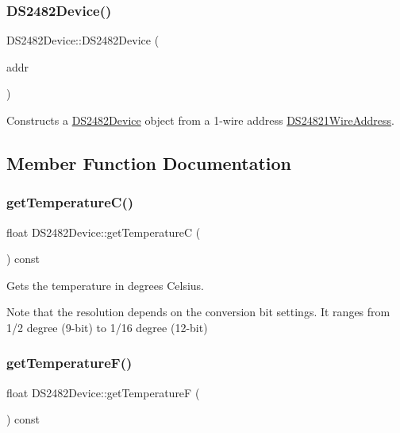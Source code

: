 \subsubsection{\texorpdfstring{D\+S2482\+Device()}{DS2482Device()}}
{\footnotesize\ttfamily D\+S2482\+Device\+::\+D\+S2482\+Device (\begin{DoxyParamCaption}\item[{const \mbox{\hyperlink{class_d_s24821_wire_address}{D\+S24821\+Wire\+Address}} \&}]{addr }\end{DoxyParamCaption})}

Constructs a \mbox{\hyperlink{class_d_s2482_device}{D\+S2482\+Device}} object from a 1-\/wire address \mbox{\hyperlink{class_d_s24821_wire_address}{D\+S24821\+Wire\+Address}}. 

\subsection{Member Function Documentation}
\mbox{\label{class_d_s2482_device_a62d317b9ec8b672fbeb8c16fa480ddd7}} 
\subsubsection{\texorpdfstring{get\+Temperature\+C()}{getTemperatureC()}}
{\footnotesize\ttfamily float D\+S2482\+Device\+::get\+TemperatureC (\begin{DoxyParamCaption}{ }\end{DoxyParamCaption}) const\hspace{0.3cm}{\ttfamily [inline]}}



Gets the temperature in degrees Celsius. 

Note that the resolution depends on the conversion bit settings. It ranges from 1/2 degree (9-\/bit) to 1/16 degree (12-\/bit) \mbox{\label{class_d_s2482_device_a61ede76341c0c6409ae3faecadbd1545}} 
\subsubsection{\texorpdfstring{get\+Temperature\+F()}{getTemperatureF()}}
{\footnotesize\ttfamily float D\+S2482\+Device\+::get\+TemperatureF (\begin{DoxyParamCaption}{ }\end{DoxyParamCaption}) const\hspace{0.3cm}{\ttfamily [inline]}}




